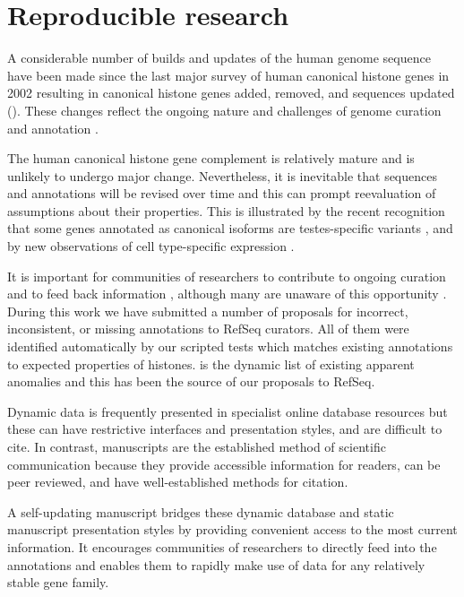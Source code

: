 \section{Reproducible research}
\label{sec:reproducible}

  A considerable number of builds and updates of the human genome sequence have been made
  since the last major survey of human canonical histone genes in 2002 \citep{Marzluff02}
  resulting in
  \AddedSinceReference{} canonical histone genes added,
  \RemovedSinceReference{} removed,
  and \SequencesUpdatedSinceReference{}
  sequences updated ().
  These changes reflect the ongoing nature and challenges of
  genome curation and annotation \citep{BorkKoonin1998}.

  The human canonical histone gene complement is relatively mature
  and is unlikely to undergo major change.
  Nevertheless, it is inevitable that sequences and annotations will be revised over time
  and this can prompt reevaluation of assumptions about their properties.
  This is illustrated by the recent recognition that
  some genes annotated as canonical isoforms are testes-specific variants \citep{Talbert2012},
  and by new observations of cell type-specific expression \citep{Molden2015}.

  It is important for communities of researchers to contribute
  to ongoing curation and to feed back information \citep{SteinNRG2001},
  although many are unaware of this opportunity \citep{HollidaySPR2015}.
  During this work we have submitted a number
  of proposals for incorrect, inconsistent, or missing annotations
  to RefSeq curators.  All of them were identified automatically
  by our scripted tests which matches existing
  annotations to expected properties of histones.
   is the dynamic list of existing apparent
  anomalies and this has been the source of our proposals to RefSeq.

  Dynamic data is frequently presented in specialist online database resources
  but these can have restrictive interfaces and presentation styles, and are difficult to cite.
  In contrast, manuscripts are the established method of scientific communication
  because they provide accessible information for readers, can be peer reviewed,
  and have well-established methods for citation.

  A self-updating manuscript bridges these dynamic database and static manuscript
  presentation styles by providing convenient access to the most current information.
  It encourages communities of researchers to directly feed into the annotations
  and enables them to rapidly make use of data for any relatively stable gene family.

